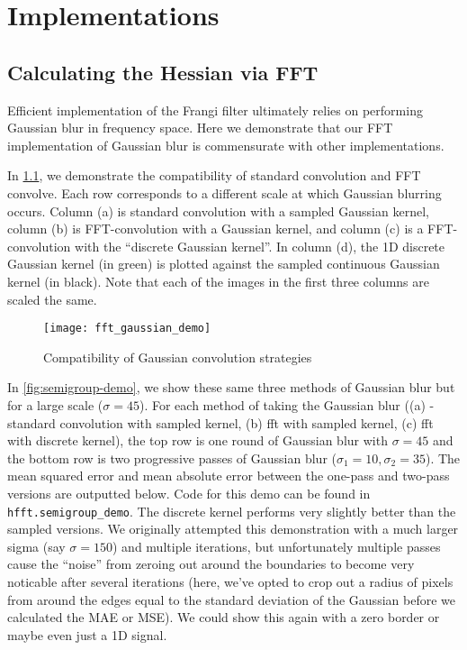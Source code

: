 \chapter{Implementations} \label{ch:implementations}


\section{Calculating the Hessian via FFT}

Efficient implementation of the Frangi filter ultimately relies on performing Gaussian blur in frequency space. Here we demonstrate that our FFT implementation of Gaussian blur is commensurate with other implementations. 

In \cref{fig:fft-gaussian-demo}, we demonstrate the compatibility of standard convolution and FFT convolve. Each row corresponds to a different scale at which Gaussian blurring  occurs. Column (a) is standard convolution with a sampled Gaussian kernel, column (b) is FFT-convolution with a Gaussian kernel, and column (c) is a FFT-convolution with the ``discrete Gaussian kernel''. In column (d), the 1D discrete Gaussian kernel (in green) is plotted against the sampled continuous Gaussian kernel (in black). Note that each of the images in the first three columns are scaled the same.
\begin{figure}
  \texttt{[image: fft\_gaussian\_demo]}
  \caption{Compatibility of Gaussian convolution strategies}
  \label{fig:fft-gaussian-demo}
\end{figure}

In \cref{fig:semigroup-demo}, we show these same three methods of Gaussian blur but for a large scale
($\sigma=45$). For each method of taking the Gaussian blur ((a) - standard convolution with sampled kernel, (b) fft with sampled kernel, (c) fft with discrete kernel), the top row is one round of Gaussian blur with $\sigma=45$ and the bottom row is two progressive passes of Gaussian blur ($\sigma_1 = 10, \sigma_2 = 35$). The mean squared error and mean absolute error between the one-pass and two-pass versions are outputted below. Code for this demo can be found in \texttt{hfft.semigroup\_demo}.
The discrete kernel performs very slightly better than the sampled versions. We originally attempted
this demonstration with a much larger sigma (say $\sigma=150$) and multiple iterations, but unfortunately multiple passes cause the ``noise'' from zeroing out around the boundaries to become very noticable after several iterations (here, we've opted to crop out a radius of pixels from around the edges equal to the standard deviation of the Gaussian before we calculated the MAE or MSE). We could show this again with a zero border or maybe even just a 1D signal.

